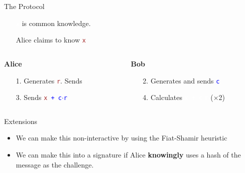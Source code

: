 \documentclass[dvipsnames]{beamer}
\newcommand{\pub}[1]{\textcolor{blue}{\texttt{#1}}}
\newcommand{\priv}[1]{\textcolor{brown}{\texttt{#1}}}
\newcommand{\enc}[1]{\colorbox{SkyBlue!75}{\textcolor{white}{\texttt{#1}}}}
\begin{document}
    \begin{frame}{The Protocol}
        \begin{itemize}
            \item[] \enc{x} is common knowledge.
            \item[] Alice claims to know \priv{x}
        \end{itemize}
        \vspace{1cm}

        \begin{columns}
            \begin{column}{0.5\textwidth}
                \textbf{Alice}
                \begin{itemize}
                    \item[1.] Generates \priv{r}. Sends \enc{r}
                    \item[]
                    \item[3.] Sends \pub{\priv{x} + c$\cdot$r}
                    \item[]
                \end{itemize}
            \end{column}
            \begin{column}{0.5\textwidth}
                \textbf{Bob}
                \begin{itemize}
                    \item[]
                    \item[2.]Generates and sends \pub{c}
                    \item[]
                    \pause
                    \item[4.]Calculates \enc{x + c$\cdot$r} ($\times$2)
                \end{itemize}
            \end{column}
        \end{columns}
    \end{frame}

    \begin{frame}{Extensions}
        \begin{itemize}
            \item We can make this non-interactive by using the Fiat-Shamir heuristic
            \item We can make this into a signature if Alice \textbf{knowingly} uses a hash of the message as the challenge.
        \end{itemize}
    \end{frame}
\end{document}
